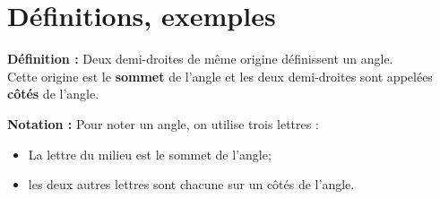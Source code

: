 





\section{Définitions, exemples}

\noindent \textbf{Définition :} Deux demi-droites de même origine définissent un angle. \\ Cette origine est le \textbf{sommet} de l'angle et les deux demi-droites sont appelées \textbf{côtés} de l'angle.

\noindent \textbf{Notation :} Pour noter un angle, on utilise trois lettres :
\begin{itemize}[label=\textbullet]
\item La lettre du milieu est le sommet de l'angle;
\item les deux autres lettres sont chacune sur un côtés de l'angle.
\end{itemize}


